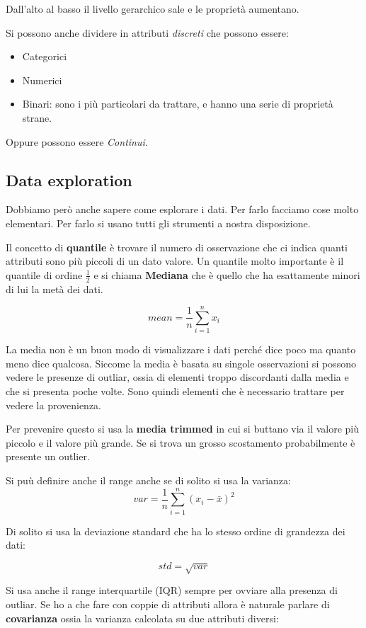 \documentclass[12pt, a4paper,titlepage,openany]{article}
\begin{document}
Dall'alto al basso il livello gerarchico sale e le proprietà aumentano.

Si possono anche dividere in attributi \textit{discreti} che possono essere:
\begin{itemize}
	\item Categorici
	\item Numerici
	\item Binari: sono i più particolari da trattare, e hanno una serie di proprietà strane.
\end{itemize}
Oppure possono essere \textit{Continui.}

\subsection{Data exploration}

Dobbiamo però anche sapere come esplorare i dati. Per farlo facciamo cose molto elementari.
Per farlo si usano tutti gli strumenti a nostra disposizione.

Il concetto di \textbf{quantile} è trovare il numero di osservazione che ci indica quanti attributi sono più piccoli di un dato valore.
Un quantile molto importante è il quantile di ordine $\frac{1}{2}$ e si chiama \textbf{Mediana} che è quello che ha esattamente minori di lui la metà dei dati.

\[mean = \frac{1}{n}\sum_{i=1}^{n}x_i\]

La media non è un buon modo di visualizzare i dati perché dice poco ma quanto meno dice qualcosa. Siccome la media è basata su singole osservazioni si possono vedere le presenze di outliar, ossia di elementi troppo discordanti dalla media e che si presenta poche volte. Sono quindi elementi che è necessario trattare per vedere la provenienza.

Per prevenire questo si usa la \textbf{media trimmed} in cui si buttano via il valore più piccolo e il valore più grande. Se si trova un grosso scostamento probabilmente è presente un outlier.

Si puù definire anche il range anche se di solito si usa la varianza:
\[var = \frac{1}{n}\sum_{i = 1}^{n} (x_{i} - \bar{x})^{2}\]

Di solito si usa la deviazione standard che ha lo stesso ordine di grandezza dei dati:

\[ std = \sqrt{var} \]

Si usa anche il range interquartile (IQR) sempre per ovviare alla presenza di outliar.
Se ho a che fare con coppie di attributi allora è naturale parlare di \textbf{covarianza} ossia la varianza calcolata su due attributi diversi:
\end{document}
